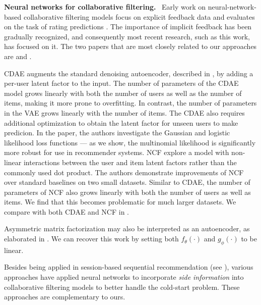 \documentclass[sigconf]{acmart}
\DeclareRobustCommand{\parhead}[1]{\textbf{#1}~}
\begin{document}
\parhead{Neural networks for collaborative filtering.} 
Early work on neural-network-based collaborative filtering models focus on explicit 
feedback data and evaluates on the task of 
rating predictions \citep{salakhutdinov2007restricted,pmlr-v28-georgiev13,sedhain2015autorec,pmlr-v48-zheng16}. 
The importance of implicit feedback has been gradually recognized, and consequently most recent research, such as this work, has focused on it. 
The two papers that are most closely related 
to our approaches are  \citep{wu2016collaborative} and  \citep{he2017neural}. 

\Gls{CDAE} \citep{wu2016collaborative} augments the standard denoising autoencoder, described in , by adding a 
per-user latent factor to the input. The number of parameters of the \gls{CDAE} model grows linearly with both 
the number of users as well as the number of items, making it more prone to overfitting.
In contrast, the number of parameters in the \gls{VAE} grows linearly with the number of items. The \gls{CDAE} also requires additional optimization to obtain the latent factor for unseen users to make predicion. 
In the paper, the authors investigate the Gaussian and logistic likelihood 
loss functions --- as we show, the multinomial likelihood is significantly more robust for use in recommender systems. 
\Gls{NCF} \citep{he2017neural} explore a model with non-linear interactions between the user and item latent 
factors rather than the commonly used dot product. The authors demonstrate improvements of \gls{NCF} over standard 
baselines on two small datasets. Similar to \gls{CDAE}, the number of parameters of \gls{NCF} 
also grows linearly with both the number of users as well as items. We find that this becomes problematic for much 
larger datasets. We compare with both \gls{CDAE} and \gls{NCF} in .

Asymmetric matrix factorization \citep{paterek2007improving} may also be interpreted as an autoencoder, as 
elaborated in \citet{steck2015gaussian}. We can recover this work by setting both $f_\theta(\cdot)$ and $g_\phi(\cdot)$ to be linear.

Besides being applied in session-based sequential recommendation (see ),
various approaches \citep{NIPS2013_5004,liang2015content,almahairi2015learning,wang2015collaborative} have applied neural networks 
to incorporate \emph{side information} into collaborative filtering models to better handle the cold-start problem.
These approaches are complementary to ours.
 
\end{document}
